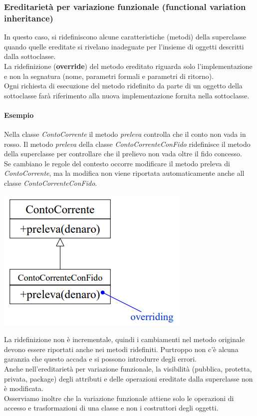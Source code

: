 \documentclass{article}
\begin{document}
	\subsubsection{Ereditarietà per variazione funzionale (functional variation inheritance)}
	In questo caso, si ridefiniscono alcune caratteristiche (metodi) della superclasse quando quelle ereditate si rivelano inadeguate per l'insieme di oggetti descritti dalla sottoclasse.
	\vspace{\baselineskip} \\
	La ridefinizione (\textbf{override}) del metodo ereditato riguarda solo l'implementazione e non la segnatura (nome, parametri formali e parametri di ritorno).
	\vspace{\baselineskip} \\
	Ogni richiesta di esecuzione del metodo ridefinito da parte di un oggetto della sottoclasse farà riferimento alla nuova implementazione fornita nella sottoclasse.
	\paragraph*{Esempio} Nella classe \textit{ContoCorrente} il metodo \textit{preleva} controlla che il conto non vada in rosso. Il metodo \textit{preleva} della classe \textit{ContoCorrenteConFido} ridefinisce il metodo della superclasse per controllare che il prelievo non vada oltre il fido concesso. \\
	Se cambiano le regole del contesto occorre modificare il metodo preleva di \textit{ContoCorrente}, ma la modifica non viene riportata automaticamente anche all classe \textit{ContoCorrenteConFido}.
	\begin{center}
		\includegraphics[scale=0.7]{assets/ereditarieta_variazione_funzionale.png}
	\end{center}
	La ridefinizione non è incrementale, quindi i cambiamenti nel metodo originale devono essere riportati anche nei metodi ridefiniti. Purtroppo non c'è alcuna garanzia che questo accada e si possono introdurre degli errori.
	\vspace{\baselineskip} \\
	Anche nell'ereditarietà per variazione funzionale, la visibilità (pubblica, protetta, privata, package) degli attributi e delle operazioni ereditate dalla superclasse non è modificata. \\
	Osserviamo inoltre che la variazione funzionale attiene solo le operazioni di accesso e trasformazioni di una classe e non i costruttori degli oggetti.
\end{document}
